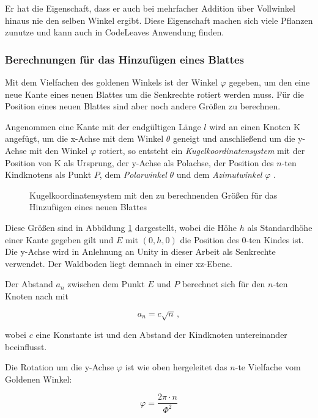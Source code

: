 Er hat die Eigenschaft, dass er auch bei mehrfacher Addition über Vollwinkel hinaus nie den selben Winkel ergibt. Diese Eigenschaft machen sich viele Pflanzen zunutze und kann auch in CodeLeaves Anwendung finden.

\subsubsection*{Berechnungen für das Hinzufügen eines Blattes}
Mit dem Vielfachen des goldenen Winkels ist der Winkel $\varphi$ gegeben, um den eine neue Kante eines neuen Blattes um die Senkrechte rotiert werden muss. Für die Position eines neuen Blattes sind aber noch andere Größen zu berechnen.

Angenommen eine Kante mit der endgültigen Länge $l$ wird an einen Knoten K angefügt, um die x-Achse mit dem Winkel $\theta$ geneigt und anschließend um die y-Achse mit den Winkel $\varphi$ rotiert, so entsteht ein \textit{Kugelkoordinatensystem} mit der Position von K als Ursprung, der y-Achse als Polachse, der Position des $n$-ten Kindknotens als Punkt $P$, dem \emph{Polarwinkel} $\theta$ und dem \emph{Azimutwinkel} $\varphi$ \cite{papula2001mathematik}.

\begin{figure}[htb]
  
  \caption{Kugelkoordinatensystem mit den zu berechnenden Größen für das Hinzufügen eines neuen Blattes}
  \label{fig:spherical-coordinates}
\end{figure}

Diese Größen sind in Abbildung \ref{fig:spherical-coordinates} dargestellt, wobei die Höhe $h$ als Standardhöhe einer Kante gegeben gilt und $E$ mit $(0, h, 0)$ die Position des $0$-ten Kindes ist. Die y-Achse wird in Anlehnung an Unity in dieser Arbeit als Senkrechte verwendet. Der Waldboden liegt demnach in einer xz-Ebene.

Der Abstand $a_n$ zwischen dem Punkt $E$ und $P$ berechnet sich für den $n$-ten Knoten nach \cite{vogel1979better} mit

\begin{equation}
\label{eq:r}
  a_n = c \sqrt{n} \,,
\end{equation}

wobei $c$ eine Konstante ist und den Abstand der Kindknoten untereinander beeinflusst.

Die Rotation um die y-Achse $\varphi$ ist wie oben hergeleitet das $n$-te Vielfache vom Goldenen Winkel:

\begin{equation}
  \varphi = \frac{2\pi \cdot n}{\Phi^{2}}
\end{equation}

